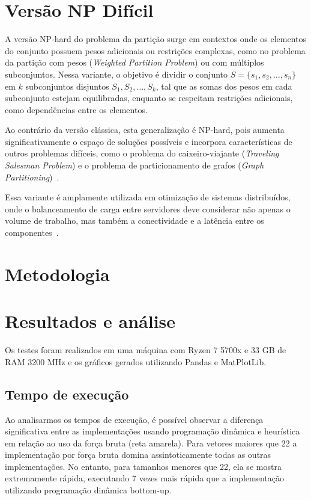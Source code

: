 \documentclass{article}
\begin{document}
\section{Versão NP Difícil}

A versão NP-hard do problema da partição surge em contextos onde os elementos do conjunto possuem pesos adicionais ou restrições complexas, como no problema da partição com pesos (\textit{Weighted Partition Problem}) ou com múltiplos subconjuntos. Nessa variante, o objetivo é dividir o conjunto $S = \{s_1, s_2, \dots, s_n\}$ em $k$ subconjuntos disjuntos \( S_1, S_2, \dots, S_k \), tal que as somas dos pesos em cada subconjunto estejam equilibradas, enquanto se respeitam restrições adicionais, como dependências entre os elementos.

Ao contrário da versão clássica, esta generalização é NP-hard, pois aumenta significativamente o espaço de soluções possíveis e incorpora características de outros problemas difíceis, como o problema do caixeiro-viajante (\textit{Traveling Salesman Problem}) e o problema de particionamento de grafos (\textit{Graph Partitioning})~\cite{garey1979computers, papadimitriou1994computational}. 

Essa variante é amplamente utilizada em otimização de sistemas distribuídos, onde o balanceamento de carga entre servidores deve considerar não apenas o volume de trabalho, mas também a conectividade e a latência entre os componentes~\cite{martello1981knapsack}.

\section{Metodologia}

\section{Resultados e análise}
Os testes foram realizados em uma máquina com Ryzen 7 5700x e 33 GB de RAM 3200 MHz e os gráficos gerados utilizando Pandas e MatPlotLib.

\subsection{Tempo de execução}

Ao analisarmos os tempos de execução, é possível observar a diferença significativa entre as implementações usando programação dinâmica e heurística em relação ao uso da força bruta (reta amarela). Para vetores maiores que 22 a implementação por força bruta domina assintoticamente todas as outras implementações. No entanto, para tamanhos menores que 22, ela se mostra extremamente rápida, executando 7 vezes mais rápida que a implementação utilizando programação dinâmica bottom-up.
\end{document}
